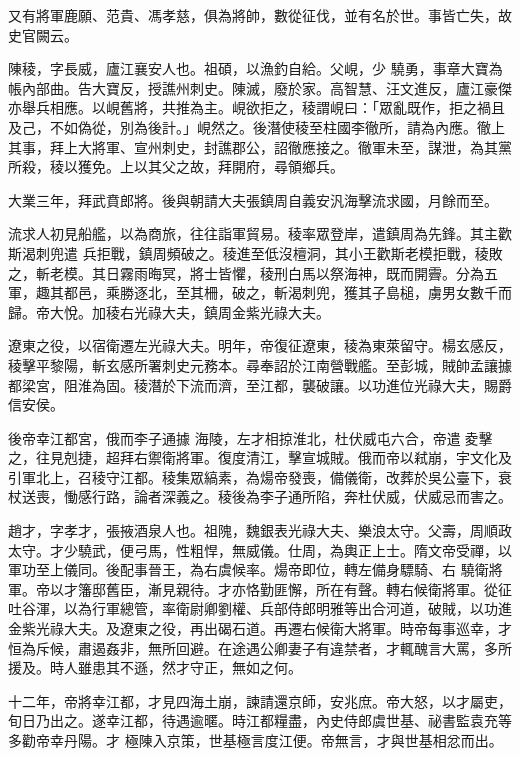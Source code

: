 \begin{pinyinscope}
 又有將軍鹿願、范貴、馮孝慈，俱為將帥，數從征伐，並有名於世。事皆亡失，故史官闕云。



 陳稜，字長威，廬江襄安人也。祖碩，以漁釣自給。父峴，少
 驍勇，事章大寶為帳內部曲。告大寶反，授譙州刺史。陳滅，廢於家。高智慧、汪文進反，廬江豪傑亦舉兵相應。以峴舊將，共推為主。峴欲拒之，稜謂峴曰：「眾亂既作，拒之禍且及己，不如偽從，別為後計。」峴然之。後潛使稜至柱國李徹所，請為內應。徹上其事，拜上大將軍、宣州刺史，封譙郡公，詔徹應接之。徹軍未至，謀泄，為其黨所殺，稜以獲免。上以其父之故，拜開府，尋領鄉兵。



 大業三年，拜武賁郎將。後與朝請大夫張鎮周自義安汎海擊流求國，月餘而至。



 流求人初見船艦，以為商旅，往往詣軍貿易。稜率眾登岸，遣鎮周為先鋒。其主歡斯渴刺兜遣
 兵拒戰，鎮周頻破之。稜進至低沒檀洞，其小王歡斯老模拒戰，稜敗之，斬老模。其日霧雨晦冥，將士皆懼，稜刑白馬以祭海神，既而開霽。分為五軍，趣其都邑，乘勝逐北，至其柵，破之，斬渴刺兜，獲其子島槌，虜男女數千而歸。帝大悅。加稜右光祿大夫，鎮周金紫光祿大夫。



 遼東之役，以宿衛遷左光祿大夫。明年，帝復征遼東，稜為東萊留守。楊玄感反，稜擊平黎陽，斬玄感所署刺史元務本。尋奉詔於江南營戰艦。至彭城，賊帥孟讓據都梁宮，阻淮為固。稜潛於下流而濟，至江都，襲破讓。以功進位光祿大夫，賜爵信安侯。



 後帝幸江都宮，俄而李子通據
 海陵，左才相掠淮北，杜伏威屯六合，帝遣夌擊之，往見剋捷，超拜右禦衛將軍。復度清江，擊宣城賊。俄而帝以弒崩，宇文化及引軍北上，召稜守江都。稜集眾縞素，為煬帝發喪，備儀衛，改葬於吳公臺下，衰杖送喪，慟感行路，論者深義之。稜後為李子通所陷，奔杜伏威，伏威忌而害之。



 趙才，字孝才，張掖酒泉人也。祖隗，魏銀表光祿大夫、樂浪太守。父壽，周順政太守。才少驍武，便弓馬，性粗悍，無威儀。仕周，為輿正上士。隋文帝受禪，以軍功至上儀同。後配事晉王，為右虞候率。煬帝即位，轉左備身驃騎、右
 驍衛將軍。帝以才籓邸舊臣，漸見親待。才亦恪勤匪懈，所在有聲。轉右候衛將軍。從征吐谷渾，以為行軍總管，率衛尉卿劉權、兵部侍郎明雅等出合河道，破賊，以功進金紫光祿大夫。及遼東之役，再出碣石道。再遷右候衛大將軍。時帝每事巡幸，才恒為斥候，肅遏姦非，無所回避。在途遇公卿妻子有違禁者，才輒醜言大罵，多所援及。時人雖患其不遜，然才守正，無如之何。



 十二年，帝將幸江都，才見四海土崩，諫請還京師，安兆庶。帝大怒，以才屬吏，旬日乃出之。遂幸江都，待遇逾暱。時江都糧盡，內史侍郎虞世基、祕書監袁充等多勸帝幸丹陽。才
 極陳入京策，世基極言度江便。帝無言，才與世基相忿而出。




\end{pinyinscope}
